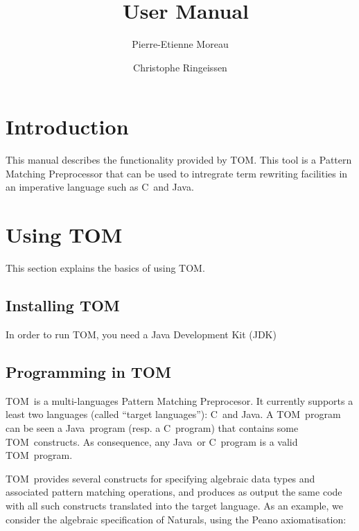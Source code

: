 \documentclass[a4paper]{article}
\title{\TOM\ User Manual}
\author{Pierre-Etienne Moreau \and Christophe Ringeissen}
\date{}
\newcommand{\TOM}{\textsf{TOM}}
\newcommand{\JTOM}{\textsf{JTOM}}
\newcommand{\C}{\textsf{C}}
\newcommand{\Java}{\textsf{Java}}
\begin{document}
\maketitle

\tableofcontents
\newpage


\section{Introduction}

This manual describes the functionality provided by \TOM. 
This tool is a Pattern Matching Preprocessor that can be used to
intregrate term rewriting facilities in an imperative language such as
\C\ and \Java.

\section{Using \TOM}

This section explains the basics of using \TOM. 

\subsection{Installing \TOM}
In order to run \TOM, you need a Java Development Kit (JDK)

\subsection{Programming in \TOM}
\TOM\ is a multi-languages Pattern Matching Preprocesor. It currently
supports a least two languages (called ``target languages''): \C\ and \Java.
A \TOM\ program can be seen a \Java\ program (resp. a \C\ program)
that contains some \TOM\ constructs. As consequence, any \Java\ or \C\
program is a valid \TOM\ program. 

\TOM\ provides several constructs for specifying algebraic data types
and associated pattern matching operations, and produces as output the
same code with all such constructs translated into the target language.
As an example, we consider the algebraic specification of Naturals,
using the Peano axiomatisation:
\end{document}
